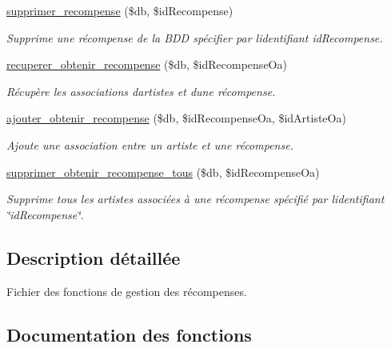 \begin{DoxyCompactItemize}
\hyperlink{fonctionRecompense_8php_a270bb87b64f754522b50f646626646f8}{supprimer\+\_\+recompense} (\$db, \$id\+Recompense)
\begin{DoxyCompactList}\small\item\em Supprime une récompense de la B\+DD spécifier par l\textquotesingle{}identifiant \textquotesingle{}id\+Recompense\textquotesingle{}. \end{DoxyCompactList}\item 
\hyperlink{fonctionRecompense_8php_acb5a37e96fc52d069192a568ae4eefd9}{recuperer\+\_\+obtenir\+\_\+recompense} (\$db, \$id\+Recompense\+Oa)
\begin{DoxyCompactList}\small\item\em Récupère les associations d\textquotesingle{}artistes et d\textquotesingle{}une récompense. \end{DoxyCompactList}\item 
\hyperlink{fonctionRecompense_8php_a030fb46b402a99682a4850a53c8674f0}{ajouter\+\_\+obtenir\+\_\+recompense} (\$db, \$id\+Recompense\+Oa, \$id\+Artiste\+Oa)
\begin{DoxyCompactList}\small\item\em Ajoute une association entre un artiste et une récompense. \end{DoxyCompactList}\item 
\hyperlink{fonctionRecompense_8php_a16ae3dcef74e4658db290ad2c4c53eed}{supprimer\+\_\+obtenir\+\_\+recompense\+\_\+tous} (\$db, \$id\+Recompense\+Oa)
\begin{DoxyCompactList}\small\item\em Supprime tous les artistes associées à une récompense spécifié par l\textquotesingle{}identifiant \char`\"{}id\+Recompense\char`\"{}. \end{DoxyCompactList}\end{DoxyCompactItemize}


\subsection{Description détaillée}
Fichier des fonctions de gestion des récompenses. 



\subsection{Documentation des fonctions}
\mbox{\label{fonctionRecompense_8php_a030fb46b402a99682a4850a53c8674f0}} 
